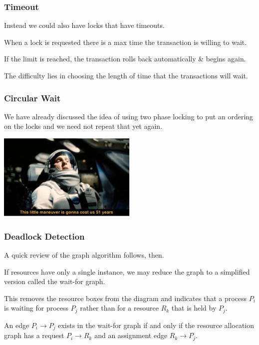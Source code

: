\begin{frame}
\frametitle{Timeout}

Instead we could also have locks that have timeouts. 

When a lock is requested there is a max time the transaction is willing to wait. 

If the limit is reached, the transaction rolls back automatically \& begins again. 

The difficulty lies in choosing the length of time that the transactions will wait.

\end{frame}

\begin{frame}
\frametitle{Circular Wait}

We have already discussed the idea of using two phase locking to put an ordering on the locks and we need not repeat that yet again. 

\begin{center}
	\includegraphics[width=0.5\textwidth]{images/infiniteloop.png}
\end{center}


\end{frame}

\begin{frame}
\frametitle{Deadlock Detection}

A quick review of the graph algorithm follows, then. 

If resources have only a single instance, we may reduce the graph to a simplified version called the \alert{wait-for} graph. 

This removes the resource boxes from the diagram and indicates that a process $P_{i}$ is waiting for process $P_{j}$ rather than for a resource $R_{k}$ that is held by $P_{j}$. 

An edge $P_{i} \rightarrow P_{j}$ exists in the wait-for graph if and only if the resource allocation graph has a request $P_{i} \rightarrow R_{k}$ and an assignment edge $R_{k} \rightarrow P_{j}$. 

\end{frame}


